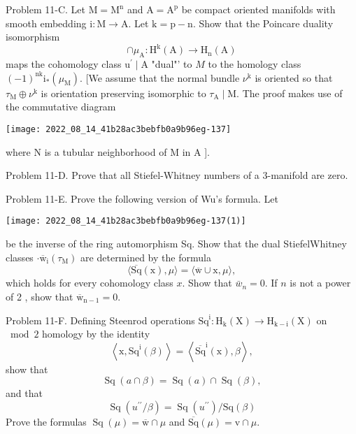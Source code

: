 \documentclass[10pt]{article}
\begin{document}
Problem 11-C. Let $\mathrm{M}=\mathrm{M}^{\mathrm{n}}$ and $\mathrm{A}=\mathrm{A}^{\mathrm{p}}$ be compact oriented manifolds with smooth embedding $\mathrm{i}: \mathrm{M} \rightarrow \mathrm{A}$. Let $\mathrm{k}=\mathrm{p}-\mathrm{n}$. Show that the Poincare duality isomorphism
$$
\cap \mu_{\mathrm{A}}: \mathrm{H}^{\mathrm{k}}(\mathrm{A}) \rightarrow \mathrm{H}_{\mathrm{n}}(\mathrm{A})
$$
maps the cohomology class $\mathrm{u}^{\prime} \mid \mathrm{A}$ "dual"' to $M$ to the homology class $(-1)^{\mathrm{nk}} \mathrm{i}_{*}\left(\mu_{\mathrm{M}}\right)$. [We assume that the normal bundle $\nu^{\mathrm{k}}$ is oriented so that $\tau_{\mathrm{M}} \oplus \nu^{\mathrm{k}}$ is orientation preserving isomorphic to $\tau_{\mathrm{A}} \mid \mathrm{M}$. The proof makes use of the commutative diagram

\texttt{[image: 2022\_08\_14\_41b28ac3bebfb0a9b96eg-137]}

where $\mathrm{N}$ is a tubular neighborhood of $\mathrm{M}$ in $\mathrm{A}$ ].

Problem 11-D. Prove that all Stiefel-Whitney numbers of a 3-manifold are zero.

Problem 11-E. Prove the following version of Wu's formula. Let

\texttt{[image: 2022\_08\_14\_41b28ac3bebfb0a9b96eg-137(1)]}

be the inverse of the ring automorphism Sq. Show that the dual StiefelWhitney classes $\cdot \overline{\mathrm{w}}_{\mathrm{i}}\left(\tau_{\mathrm{M}}\right)$ are determined by the formula
$$
\langle\overline{\mathrm{Sq}}(\mathrm{x}), \mu\rangle=\langle\overline{\mathrm{w}} \cup \mathrm{x}, \mu\rangle,
$$
which holds for every cohomology class $x$. Show that $\bar{w}_{n}=0$. If $n$ is not a power of 2 , show that $\overline{\mathrm{w}}_{\mathrm{n}-1}=0$.

Problem 11-F. Defining Steenrod operations $\mathrm{Sq}^{\mathrm{i}}: \mathrm{H}_{\mathrm{k}}(\mathrm{X}) \rightarrow \mathrm{H}_{\mathrm{k}-\mathrm{i}}(\mathrm{X})$ on $\bmod 2$ homology by the identity
$$
\left\langle\mathrm{x}, \mathrm{Sq}^{\mathrm{i}}(\beta)\right\rangle=\left\langle\overline{\mathrm{Sq}}^{\mathrm{i}}(\mathrm{x}), \beta\right\rangle,
$$
show that
$$
\operatorname{Sq}(a \cap \beta)=\operatorname{Sq}(a) \cap \operatorname{Sq}(\beta),
$$
and that
$$
\operatorname{Sq}\left(u^{\prime \prime} / \beta\right)=\operatorname{Sq}\left(u^{\prime \prime}\right) / \mathrm{Sq}(\beta)
$$
Prove the formulas $\operatorname{Sq}(\mu)=\overline{\mathrm{w}} \cap \mu$ and $\overline{\mathrm{Sq}}(\mu)=\mathrm{v} \cap \mu$.
\end{document}
